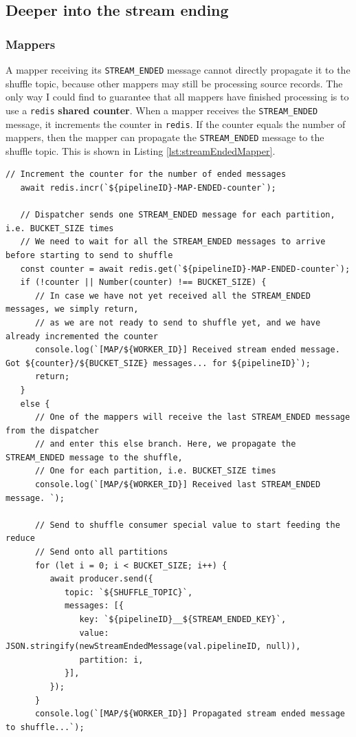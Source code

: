 \subsection{Deeper into the stream ending}

\subsubsection{Mappers}
A mapper receiving its \lstinline|STREAM_ENDED| message cannot directly propagate it to the shuffle topic, because other mappers may still be processing source records.
The only way I could find to guarantee that all mappers have finished processing is to use a \texttt{redis} \textbf{shared counter}.
When a mapper receives the \lstinline|STREAM_ENDED| message, it increments the counter in \texttt{redis}.
If the counter equals the number of mappers, then the mapper can propagate the \lstinline|STREAM_ENDED| message to the shuffle topic.
This is shown in Listing \ref{lst:streamEndedMapper}.

\begin{lstlisting}[label={lst:streamEndedMapper}, caption={Handling the STREAM\_ENDED message in a mapper},captionpos={top}]
   // Increment the counter for the number of ended messages
   await redis.incr(`${pipelineID}-MAP-ENDED-counter`);
   
   // Dispatcher sends one STREAM_ENDED message for each partition, i.e. BUCKET_SIZE times
   // We need to wait for all the STREAM_ENDED messages to arrive before starting to send to shuffle
   const counter = await redis.get(`${pipelineID}-MAP-ENDED-counter`);
   if (!counter || Number(counter) !== BUCKET_SIZE) {
      // In case we have not yet received all the STREAM_ENDED messages, we simply return,
      // as we are not ready to send to shuffle yet, and we have already incremented the counter
      console.log(`[MAP/${WORKER_ID}] Received stream ended message. Got ${counter}/${BUCKET_SIZE} messages... for ${pipelineID}`);
      return;
   }
   else {
      // One of the mappers will receive the last STREAM_ENDED message from the dispatcher
      // and enter this else branch. Here, we propagate the STREAM_ENDED message to the shuffle,
      // One for each partition, i.e. BUCKET_SIZE times
      console.log(`[MAP/${WORKER_ID}] Received last STREAM_ENDED message. `);
   
      // Send to shuffle consumer special value to start feeding the reduce
      // Send onto all partitions
      for (let i = 0; i < BUCKET_SIZE; i++) {
         await producer.send({
            topic: `${SHUFFLE_TOPIC}`,
            messages: [{
               key: `${pipelineID}__${STREAM_ENDED_KEY}`,
               value: JSON.stringify(newStreamEndedMessage(val.pipelineID, null)),
               partition: i,
            }],
         });
      }
      console.log(`[MAP/${WORKER_ID}] Propagated stream ended message to shuffle...`);
\end{lstlisting}


